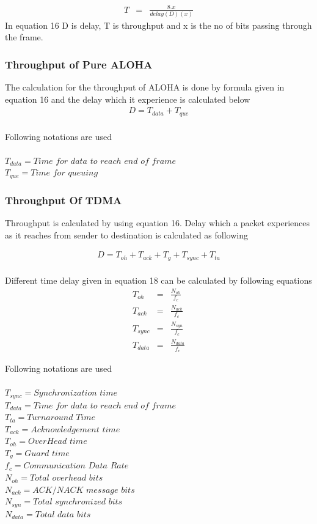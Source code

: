 \documentclass[11pt, conference, compsocconf, onecolumn]{IEEEtran}
\begin{document}
\begin{eqnarray}
T&=& \frac{8.x}{delay(D) (x)}
\end{eqnarray}
In equation 16 D is delay, T is throughput and x is the no of bits passing through the frame.
\subsubsection{Throughput of Pure ALOHA}
The calculation for the throughput of ALOHA is done by formula given in equation 16 and the delay which it experience is calculated below
\begin{eqnarray}
D=T_{data} + T_{que}
\end{eqnarray}
\\
Following notations are used
\\\\
$T_{data}=Time$ $for$ $data$ $to$ $reach$ $end$ $of$ $frame$
\\
$T_{que}=Time$ $for$ $queuing$
\\

\subsubsection{Throughput Of TDMA}

Throughput is calculated by using equation 16. Delay which a packet experiences as it reaches from sender to destination is calculated as following

\begin{eqnarray}
D=T_{oh}+T_{ack}+T_{g}+T_{sync}+T_{ta}
\end{eqnarray}
\\
Different time delay given in equation 18 can be calculated by following equations
\\
\begin{eqnarray}
T_{oh} & =&\frac{N_{oh}}{f_{c}}
\\
T_{ack}&=&\frac{N_{ack}}{f_{c}}
\\
T_{sync}&=&\frac{N_{syn}}{f_{c}}
\\
T_{data}&=&\frac{N_{data}}{f_{c}}
\end{eqnarray}

Following notations are used
\\\\
$T_{sync}=Synchronization$ $time$
\\
$T_{data}=Time$ $for$ $data$ $to$ $reach$ $end$ $of$ $frame$
\\
$T_{ta}=Turnaround$ $Time$
\\
$T_{ack}=Acknowledgement$ $time$
\\
$T_{oh}=OverHead$ $time$
\\
$T_{g}=Guard$ $time$
\\
$f_{c}= Communication$ $Data$ $Rate$
\\
$N_{oh}=Total$ $overhead$ $bits$
\\
$N_{ack}=ACK/NACK$ $message$ $bits$
\\
$N_{syn}=Total$ $synchronized$ $bits$
\\
$N_{data}=Total$ $data$ $bits$
\\
\end{document}
